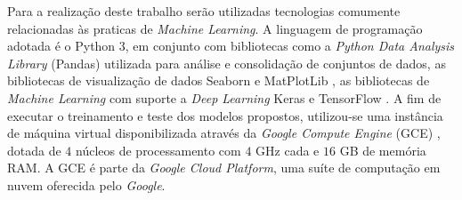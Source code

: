 
Para a realização deste trabalho serão utilizadas tecnologias comumente relacionadas às praticas de \emph{Machine Learning}. A linguagem de programação adotada é o Python 3, em conjunto com bibliotecas como a \emph{Python Data Analysis Library} (Pandas) \cite{pandas} utilizada para análise e consolidação de conjuntos de dados, as bibliotecas de visualização de dados Seaborn \cite{seaborn} e MatPlotLib \cite{matplotlib}, as bibliotecas de \emph{Machine Learning} com suporte a \emph{Deep Learning} Keras \cite{keras} e TensorFlow \cite{tensorflow}. A fim de executar o treinamento e teste dos modelos propostos, utilizou-se uma instância de máquina virtual disponibilizada através da \emph{Google Compute Engine} (GCE) \cite{gce}, dotada de $4$ núcleos de processamento com $4$ GHz cada e $16$ GB de memória RAM. A GCE é parte da \emph{Google Cloud Platform}, uma suíte de computação em nuvem oferecida pelo \emph{Google}.
